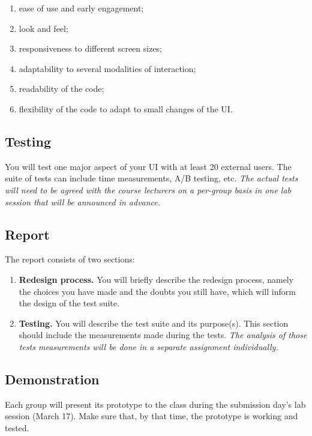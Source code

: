 \documentclass[a4,12pt]{article}
\begin{document}
\begin{enumerate}[-, noitemsep]
\item ease of use and early engagement;
\item look and feel;
\item responsiveness to different screen sizes;
\item adaptability to several modalities of interaction;
\item readability of the code;
\item flexibility of the code to adapt to small changes of the UI.
\end{enumerate}

\subsection{Testing}

You will test one major aspect of your UI with at least 20 external users. The suite of tests can include time measurements, A/B testing, etc. \emph{The actual tests will need to be agreed with the course lecturers on a per-group basis in one lab session that will be announced in advance.}

\subsection{Report}
The report consists of two sections:
\begin{enumerate}[noitemsep]
\item {\bf Redesign process.} 
You will briefly describe the redesign process, namely the choices you have made and the doubts you still have, which will inform the design of the test suite.
\item {\bf Testing.} 
You will describe the test suite and its purpose(s). This section should include the measurements made during the tests. \emph{The analysis of those tests measurements will be done in a separate assignment individually.}

\end{enumerate}

\subsection{Demonstration}
Each group will present its prototype to the class during the submission day's lab session (March 17).
Make sure that, by that time, the prototype is working and tested.
\end{document}
